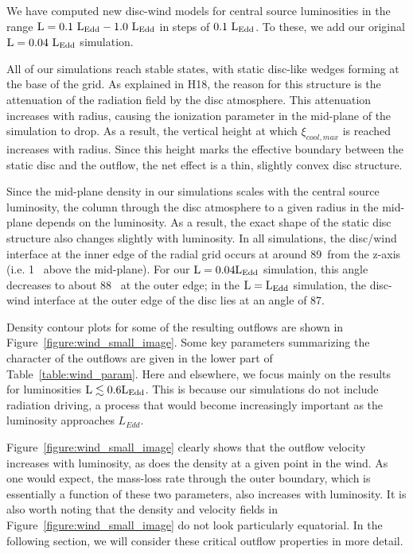 \documentclass[a4paper,fleqn,usenatbib]{mnras}
\begin{document}
We have computed new disc-wind models for central source luminosities
in the range $\rm{L=0.1~L_{Edd}-1.0~L_{Edd}}$ in steps of
$\rm{0.1~L_{Edd}}$. To these, we add our original
$\rm{L=0.04~L_{Edd}}$ simulation. 

All of our simulations reach stable states, with static disc-like
wedges forming at the base of the grid. As explained in H18, the
reason for this structure is the attenuation of the radiation field by the disc
atmosphere. This attenuation increases with radius, causing the
ionization parameter in the mid-plane of the simulation to drop. As a
result, the vertical height at which $\xi_{cool,max}$ is reached
increases with radius. Since this height marks the effective boundary
between the static disc and the outflow, the net effect is a thin,
slightly convex disc structure. 

Since the mid-plane density in our simulations scales with the central
source luminosity, the column through the disc atmosphere to a given
radius in the mid-plane depends on the luminosity. As a result, the
exact shape of the static disc structure also changes slightly with
luminosity. In all simulations, the disc/wind interface at the
inner edge of the radial grid occurs at around 89\degree~from the
z-axis (i.e. 1\degree~ above the mid-plane). For our $\rm{L = 0.04L_{Edd}}$ 
simulation, this angle decreases to about 88\degree~ at the outer
edge; in the $\rm{L = L_{Edd}}$ simulation, the disc-wind interface at
the outer edge of the disc lies at an angle of 87\degree.

Density contour plots for some of the resulting outflows are shown in
Figure~\ref{figure:wind_small_image}. Some key parameters summarizing
the character of the outflows are given in the lower part of Table~\ref{table:wind_param}. Here and elsewhere, we focus mainly on the
results for luminosities $\rm{L \lesssim 0.6 L_{Edd}}$. This is
because our simulations do not include radiation driving, a process
that would become increasingly important as the luminosity approaches $L_{Edd}$. 

Figure~\ref{figure:wind_small_image} clearly shows that the outflow
velocity increases with luminosity, as does the density at a given
point in the wind. As one would expect, the mass-loss rate through the
outer boundary, which is essentially a function of these two
parameters, also increases with luminosity. It is also worth noting
that the density and velocity fields in
Figure~\ref{figure:wind_small_image} do not look particularly 
equatorial. In the following section, we
will consider these critical outflow properties in more detail.
\end{document}
